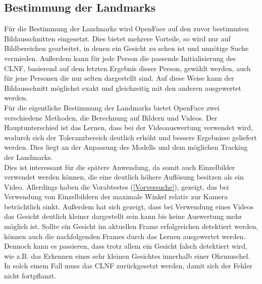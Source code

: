 \subsection{Bestimmung der Landmarks}
\label{bestimmung_Landmarks}
Für die Bestimmung der Landmarks wird OpenFace auf den zuvor bestimmten Bildausschnitten eingesetzt. Dies bietet mehrere Vorteile, so wird nur auf Bildbereichen gearbeitet, in denen ein Gesicht zu sehen ist und unnötige Suche vermieden. Außerdem kann für jede Person die passende Initialisierung des CLNF, basierend auf dem letzten Ergebnis dieser Person, gewählt werden, auch für jene Personen die nur selten dargestellt sind. Auf diese Weise kann der Bildausschnitt möglichst exakt und gleichzeitig mit den anderen ausgewertet werden.\\
Für die eigentliche Bestimmung der Landmarks bietet OpenFace zwei verschiedene Methoden, die Berechnung auf Bildern und Videos. Der Hauptunterschied ist das Lernen, dass bei der Videoauswertung verwendet wird, wodurch sich der Toleranzbereich deutlich erhöht und bessere Ergebnisse geliefert werden. Dies liegt an der Anpassung des Modells und dem möglichen Tracking der Landmarks.\\
Dies ist interessant für die spätere Anwendung, da somit auch Einzelbilder verwendet werden können, die eine deutlich höhere Auflösung besitzen als ein Video. Allerdings haben die Vorabtestes (\autoref{Vorversuche}), gezeigt, das bei Verwendung von Einzelbildern der maximale Winkel relativ zur Kamera beträchtlich sinkt. Außerdem hat sich gezeigt, dass bei Verwendung eines Videos das Gesicht deutlich kleiner dargestellt sein kann bis keine Auswertung mehr möglich ist. Sollte ein Gesicht im aktuellen Frame erfolgreichen detektiert werden, können auch die nachfolgenden Frames durch das Lernen ausgewertet werden.\\
Dennoch kann es passieren, dass trotz allem ein Gesicht falsch detektiert wird, wie z.B. das Erkennen eines sehr kleinen Gesichtes innerhalb einer Ohrmuschel. In solch einem Fall muss das CLNF zurückgesetzt werden, damit sich der Fehler nicht fortpflanzt.
